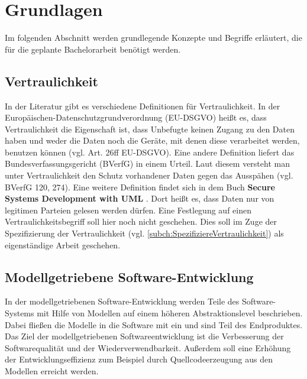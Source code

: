 
\chapter{Grundlagen}
\label{ch:Grundlagen}
Im folgenden Abschnitt werden grundlegende Konzepte und Begriffe erläutert, die für die geplante Bachelorarbeit benötigt werden.
\section{Vertraulichkeit}
In der Literatur gibt es verschiedene Definitionen für Vertraulichkeit. In der Europäischen-Datenschutzgrundverordnung (EU-DSGVO) heißt es, dass Vertraulichkeit die Eigenschaft ist, dass Unbefugte keinen Zugang zu den Daten haben und weder die Daten noch die Geräte, mit denen diese verarbeitet werden, benutzen können (vgl. Art. 26ff EU-DSGVO). 
Eine andere Definition liefert das Bundesverfassungsgericht (BVerfG) in einem Urteil. Laut diesem versteht man unter Vertraulichkeit den Schutz vorhandener Daten gegen das Ausspähen (vgl. BVerfG 120, 274). Eine weitere Definition findet sich in dem Buch \textbf{Secure Systems Development with UML} \cite{Jurjens2005}. Dort heißt es, dass Daten nur von legitimen Parteien gelesen werden dürfen.
Eine Festlegung auf einen Vertraulichkeitsbegriff soll hier noch nicht geschehen. Dies soll im Zuge der Spezifizierung der Vertraulichkeit (vgl. \ref{subch:SpezifiziereVertraulichkeit}) als eigenständige Arbeit geschehen.



\section{Modellgetriebene Software-Entwicklung}
In der modellgetriebenen Software-Entwicklung \cite{Stahl2007} werden Teile des Software-Systems mit Hilfe von Modellen auf einem höheren Abstraktionslevel beschrieben. Dabei fließen die Modelle in die Software mit ein und sind Teil des Endproduktes. Das Ziel der modellgetriebenen Softwareentwicklung ist die Verbesserung der Softwarequalität und der Wiederverwendbarkeit. Außerdem soll eine Erhöhung der Entwicklungseffizienz zum Beispiel durch Quellcodeerzeugung aus den Modellen erreicht werden. 
